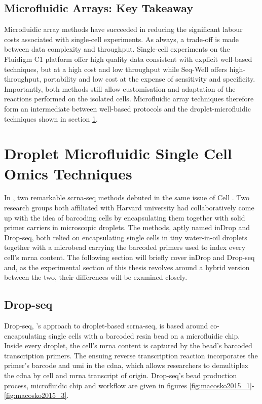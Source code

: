 \subsection{Microfluidic Arrays: Key Takeaway}
Microfluidic array methods have succeeded in reducing the significant labour costs associated with single-cell experiments. As always, a trade-off is made between data complexity and throughput. Single-cell experiments on the Fluidigm C1 platform offer high quality data consistent with explicit well-based techniques, but at a high cost and low throughput while Seq-Well offers high-throughput, portability and low cost at the expense of sensitivity and specificity. Importantly, both methods still allow customisation and adaptation of the reactions performed on the isolated cells. Microfluidic array techniques therefore form an intermediate between well-based protocols and the droplet-microfluidic techniques shown in section \ref{sec:lit_dropletmicrofluidics}.\pms

\newpage
\section{Droplet Microfluidic Single Cell Omics Techniques}
\label{sec:lit_dropletmicrofluidics}
 In \citeyear{klein2015}, two remarkable \acrlong{scrna-seq} methods debuted in the same issue of Cell \citep{klein2015, macosko2015}. Two research groups both affiliated with Harvard university had collaboratively come up with the idea of barcoding cells by encapsulating them together with solid primer carriers in microscopic droplets. The methods, aptly named inDrop and Drop-seq, both relied on encapsulating single cells in tiny water-in-oil droplets together with a microbead carrying the barcoded primers used to index every cell's \acrshort{mrna} content. The following section will briefly cover inDrop and Drop-seq and, as the experimental section of this thesis revolves around a hybrid version between the two, their differences will be examined closely.\pms

\newpage
\subsection{Drop-seq}
\label{subsect:lit_drop-seq}
Drop-seq, \citeauthor{macosko2015}'s approach to droplet-based \acrlong{scrna-seq}, is based around co-encapsulating single cells with a barcoded resin bead on a microfluidic chip. Inside every droplet, the cell's \acrshort{mrna} content is captured by the bead's barcoded transcription primers. The ensuing reverse transcription reaction incorporates the primer's barcode and \acrfull{umi} in the \acrshort{cdna}, which allows researchers to demultiplex the \acrshort{cdna} by cell and \acrshort{mrna} transcript of origin. Drop-seq's bead production process, microfluidic chip and workflow are given in figures \ref{fig:macosko2015_1}-\ref{fig:macosko2015_3}.\pms

